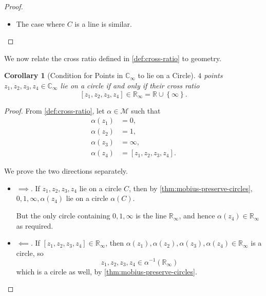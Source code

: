 \documentclass{article}
\newtheorem{corollary}[theorem]{Corollary}
\theoremstyle{definition}
\theoremstyle{remark}
\DeclarePairedDelimiter{\abs}{\lvert}{\rvert}
\newcommand{\pqty}[1]{\left(#1\right)}
\newcommand{\bqty}[1]{\left[#1\right]}
\newcommand{\Bqty}[1]{\left\{#1\right\}}
\newcommand{\conjugate}[1]{\overline{#1}}
\newcommand{\inverse}{^{-1}}
\newcommand{\RR}{\mathbb{R}}
\newcommand{\CC}{\mathbb{C}}
\newcommand{\compactify}{_{\infty}}
\newcommand{\mobius}{\mathcal{M}}
\begin{document}
\begin{proof}
\begin{itemize}
\begin{itemize}
\begin{align*}
                &\iff \abs{z - \frac{\conjugate{c}}{\abs{c}^2 - r^2}}^2 = \frac{\abs{c}^2}{\pqty{\abs{c}^2 - r^2}^2} - \frac{1}{\abs{c}^2 - r^2} \\
                &\iff \abs{z - \frac{\conjugate{c}}{\abs{c}^2 - r^2}}^2 = \frac{r^2}{\pqty{\abs{c}^2 - r^2}^2}
            \end{align*}
            is a Euclidean circle.
        \end{itemize}
        \item The case where \(C\) is a line is similar. 
    \end{itemize}
\end{proof}

We now relate the cross ratio defined in \autoref{def:cross-ratio} to geometry.

\begin{corollary}[Condition for Points in \(\CC\compactify\) to lie on a Circle]
    \(4\) points \(z_1, z_2, z_3, z_4 \in \CC\compactify\) lie on a circle if and only if their cross ratio
    \[
        \bqty{z_1, z_2, z_3, z_4} \in \RR\compactify = \RR \cup \Bqty{\infty}.
    \]
\end{corollary}

\begin{proof}
    From \autoref{def:cross-ratio}, let \(\alpha \in \mobius\) such that
    \begin{align*}
        \alpha \pqty{z_1} &= 0, \\
        \alpha \pqty{z_2} &= 1, \\
        \alpha \pqty{z_3} &= \infty, \\
        \alpha \pqty{z_4} &= \bqty{z_1, z_2, z_3, z_4}.
    \end{align*}

    We prove the two directions separately.
    \begin{itemize}
        \item \(\implies\). If \(z_1, z_2, z_3, z_4\) lie on a circle \(C\), then by \autoref{thm:mobius-preserve-circles}, \(0, 1, \infty, \alpha\pqty{z_4}\) lie on a circle \(\alpha\pqty{C}\).
        
        But the only circle containing \(0, 1, \infty\) is the line \(\RR\compactify\), and hence \(\alpha\pqty{z_4} \in \RR\compactify\) as required.

        \item \(\impliedby\). If \(\bqty{z_1, z_2, z_3, z_4} \in \RR\compactify\), then \(\alpha\pqty{z_1}, \alpha\pqty{z_2}, \alpha\pqty{z_3}, \alpha\pqty{z_4} \in \RR\compactify\) is a circle, so
        \[
            z_1, z_2, z_3, z_4 \in \alpha\inverse\pqty{\RR\compactify}
        \]
        which is a circle as well, by \autoref{thm:mobius-preserve-circles}.
    \end{itemize}
\end{proof}
\end{document}
